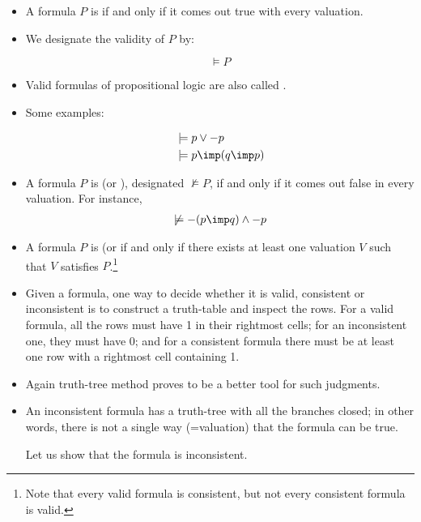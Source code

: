 \documentclass[11pt]{article}
\begin{document}
\begin{itemize}
\item A formula $P$ is  if and only if it comes out true with every
valuation.

\item[] We designate the validity of $P$ by:

$$
\models P
$$

\item[] Valid formulas of propositional logic are also called
. 

\item[] Some examples:

\begin{align}
&\models p\lor -p \\ &\models p\imp(q\imp p) \nonumber
\end{align}


\item A formula $P$ is  (or ), designated $\not\models P$, if and only if it comes out
false in every valuation. For instance,
\begin{align}\label{incons}
\not\models -(p\imp q) \land -p
	\end{align}

\item A formula $P$ is  (or  if and only if
there exists at least one valuation $V$ such that $V$ satisfies
$P$.\footnote{Note that every valid formula is consistent, but not every
consistent formula is valid.}

\item Given a formula, one way to decide whether it is valid, consistent or
inconsistent is to construct a truth-table and inspect the rows. For a valid
formula, all the rows must have 1 in their rightmost cells; for an inconsistent
one, they must have 0; and for a consistent formula there must be at least one
row with a rightmost cell containing 1.

\item Again truth-tree method proves to be a better tool for such judgments. 

\item An inconsistent formula has a truth-tree with all the branches closed; in
other words, there is not a single way (=valuation) that the formula can be
true.

\begin{uexample}
Let us show that the formula  is inconsistent.


\end{uexample}
\end{itemize}
\end{document}
